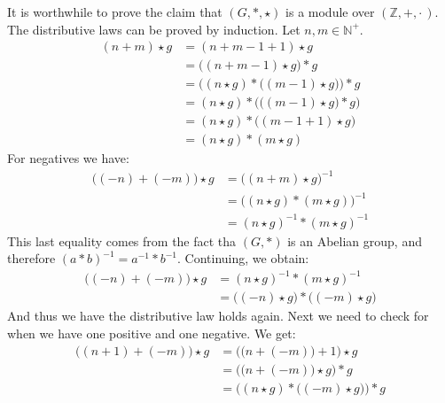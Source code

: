     It is worthwhile to prove the claim that $(G,*,\star)$ is a module over
    $(\mathbb{Z},+,\cdot\,)$. The distributive laws can be proved by induction.
    Let $n,m\in\mathbb{N}^{+}$.
    \begin{subequations}
        \begin{align}
            (n+m)\star{g}
            &=(n+m-1+1)\star{g}\\
            &=\big((n+m-1)\star{g}\big)*g\\
            &=\Big((n\star{g})*\big((m-1)\star{g}\big)\Big)*g\\
            &=(n\star{g})*\Big(\big((m-1)\star{g})*g\Big)\\
            &=(n\star{g})*\big((m-1+1)\star{g}\big)\\
            &=(n\star{g})*(m\star{g})
        \end{align}
    \end{subequations}
    For negatives we have:
    \begin{subequations}
        \begin{align}
            \big((\minus{n})+(\minus{m})\big)\star{g}
                &=\big((n+m)\star{g}\big)^{\minus{1}}\\
                &=\big((n\star{g})*(m\star{g})\big)^{\minus{1}}\\
                &=(n\star{g})^{\minus{1}}*(m\star{g})^{\minus{1}}
        \end{align}
    \end{subequations}
    This last equality comes from the fact tha $(G,*)$ is an Abelian group, and
    therefore $(a*b)^{\minus{1}}=a^{\minus{1}}*b^{\minus{1}}$. Continuing, we
    obtain:
    \begin{subequations}
        \begin{align}
            \big((\minus{n})+(\minus{m})\big)\star{g}
            &=(n\star{g})^{\minus{1}}*(m\star{g})^{\minus{1}}\\
            &=\big((\minus{n})\star{g}\big)*\big((\minus{m})\star{g}\big)
        \end{align}
    \end{subequations}
    And thus we have the distributive law holds again. Next we need to check for
    when we have one positive and one negative. We get:
    \begin{subequations}
        \begin{align}
            \big((n+1)+(\minus{m})\big)\star{g}
            &=\Big(\big(n+(\minus{m})\big)+1\Big)\star{g}\\
            &=\Big(\big(n+(\minus{m})\big)\star{g}\Big)*g\\
            &=\Big((n\star{g})*\big((\minus{m})\star{g}\big)\Big)*g
        \end{align}
    \end{subequations}
